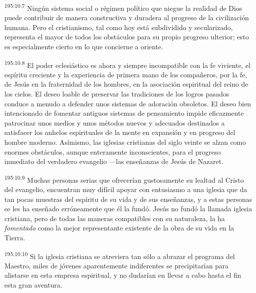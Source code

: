 \par
\textsuperscript{195:10.7} Ningún sistema social o régimen político que niegue la realidad de Dios puede contribuir de manera constructiva y duradera al progreso de la civilización humana. Pero el cristianismo, tal como hoy está subdividido y secularizado, representa el mayor de todos los obstáculos para su propio progreso ulterior; esto es especialmente cierto en lo que concierne a oriente.

\par
\textsuperscript{195:10.8} El poder eclesiástico es ahora y siempre incompatible con la fe viviente, el espíritu creciente y la experiencia de primera mano de los compañeros, por la fe, de Jesús en la fraternidad de los hombres, en la asociación espiritual del reino de los cielos. El deseo loable de preservar las tradiciones de los logros pasados conduce a menudo a defender unos sistemas de adoración obsoletos. El deseo bien intencionado de fomentar antiguos sistemas de pensamiento impide eficazmente patrocinar unos medios y unos métodos nuevos y adecuados destinados a satisfacer los anhelos espirituales de la mente en expansión y en progreso del hombre moderno. Asímismo, las iglesias cristianas del siglo veinte se alzan como enormes obstáculos, aunque enteramente inconscientes, para el progreso inmediato del verdadero evangelio ---las enseñanzas de Jesús de Nazaret.

\par
\textsuperscript{195:10.9} Muchas personas serias que ofrecerían gustosamente su lealtad al Cristo del evangelio, encuentran muy difícil apoyar con entusiasmo a una iglesia que da tan pocas muestras del espíritu de su vida y de sus enseñanzas, y a estas personas se les ha enseñado erróneamente que él la fundó. Jesús no fundó la llamada iglesia cristiana, pero de todas las maneras compatibles con su naturaleza, la ha \textit{fomentado} como la mejor representante existente de la obra de su vida en la Tierra.

\par
\textsuperscript{195:10.10} Si la iglesia cristiana se atreviera tan sólo a abrazar el programa del Maestro, miles de jóvenes aparentemente indiferentes se precipitarían para alistarse en esta empresa espiritual, y no dudarían en llevar a cabo hasta el fin esta gran aventura.

